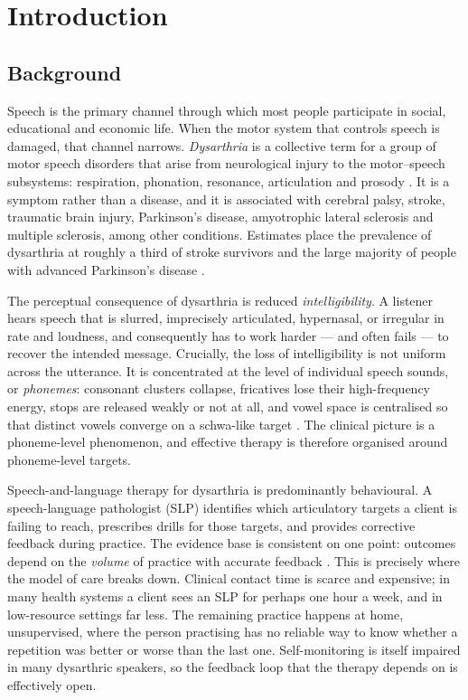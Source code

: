 \chapter{Introduction}
\label{ch:introduction}

\section{Background}
\label{sec:background}

Speech is the primary channel through which most people participate in social,
educational and economic life. When the motor system that controls speech is
damaged, that channel narrows. \emph{Dysarthria} is a collective term for a
group of motor speech disorders that arise from neurological injury to the
motor--speech subsystems: respiration, phonation, resonance, articulation and
prosody \cite{duffy2019motor}. It is a symptom rather than a disease, and it is
associated with cerebral palsy, stroke, traumatic brain injury, Parkinson's
disease, amyotrophic lateral sclerosis and multiple sclerosis, among other
conditions. Estimates place the prevalence of dysarthria at roughly a third of
stroke survivors and the large majority of people with advanced Parkinson's
disease \cite{enderby2013disorders}.

The perceptual consequence of dysarthria is reduced \emph{intelligibility}. A
listener hears speech that is slurred, imprecisely articulated, hypernasal, or
irregular in rate and loudness, and consequently has to work harder --- and
often fails --- to recover the intended message. Crucially, the loss of
intelligibility is not uniform across the utterance. It is concentrated at the
level of individual speech sounds, or \emph{phonemes}: consonant clusters
collapse, fricatives lose their high-frequency energy, stops are released
weakly or not at all, and vowel space is centralised so that distinct vowels
converge on a schwa-like target \cite{kim2011vowel}. The clinical picture is a
phoneme-level phenomenon, and effective therapy is therefore organised around
phoneme-level targets.

Speech-and-language therapy for dysarthria is predominantly behavioural. A
speech-language pathologist (SLP) identifies which articulatory targets a
client is failing to reach, prescribes drills for those targets, and provides
corrective feedback during practice. The evidence base is consistent on one
point: outcomes depend on the \emph{volume} of practice with accurate feedback
\cite{mauszycki2014treatment}. This is precisely where the model of care
breaks down. Clinical contact time is scarce and expensive; in many health
systems a client sees an SLP for perhaps one hour a week, and in low-resource
settings far less. The remaining practice happens at home, unsupervised, where
the person practising has no reliable way to know whether a repetition was
better or worse than the last one. Self-monitoring is itself impaired in many
dysarthric speakers, so the feedback loop that the therapy depends on is
effectively open.

